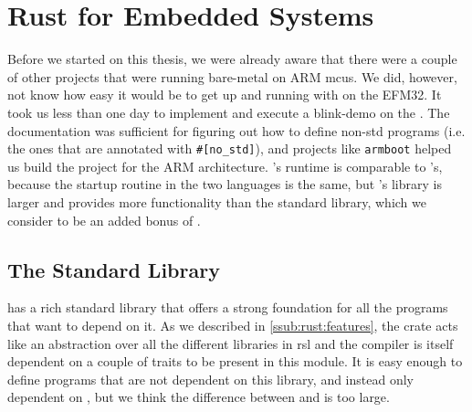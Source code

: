 
\section{Rust for Embedded Systems} %
\label{sec:disc:rust_for_arm}

Before we started on this thesis, we were already aware that there were a couple of other projects that were running {\rust} bare-metal on ARM \glspl{mcu}.
We did, however, not know how easy it would be to get up and running with {\rust} on the EFM32.
It took us less than one day to implement and execute a {\rust} blink-demo on the {\STK}.
The {\rust} documentation was sufficient for figuring out how to define non-std {\rust} programs (i.e. the ones that are annotated with \texttt{\#[no\_std]}), and projects like \texttt{armboot} helped us build the project for the ARM architecture.
{\rust}'s runtime is comparable to {\C}'s, because the startup routine in the two languages is the same, but {\rust}'s {\core} library is larger and provides more functionality than the {\C} standard library, which we consider to be an added bonus of {\rust}.

\subsection{The Standard Library} %
\label{sub:using_the_standard_library}


{\rust} has a rich standard library that offers a strong foundation for all the programs that want to depend on it.
As we described in \autoref{ssub:rust:features}, the {\std} crate acts like an abstraction over all the different libraries in \gls{rsl} and the {\rustc} compiler is itself dependent on a couple of traits to be present in this module.
It is easy enough to define programs that are not dependent on this {\std} library, and instead only dependent on {\core}, but we think the difference between {\std} and {\core} is too large.

